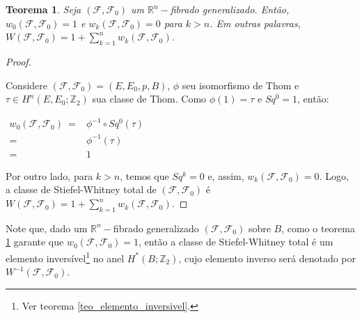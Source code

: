 \documentclass[12pt,oneside]{book} %
\newtheorem{teo}    {\hspace{0.5cm}Teorema}[chapter]
\newcommand{\ds}{\displaystyle}
\newcommand{\R}{\mathbb{R}}
\newcommand{\Z}{\mathbb{Z}}
\begin{document}
\begin{teo}\label{res_SW_fht_1}
	Seja $(\mathcal{F},\mathcal{F}_{0})$ um $\R^{n}-$fibrado generalizado. Então, $w_{0}(\mathcal{F},\mathcal{F}_{0})=1$ e $w_{k}(\mathcal{F},\mathcal{F}_{0})=0$ para $k>n$. Em outras palavras, $W(\mathcal{F},\mathcal{F}_{0})=1+\ds\sum_{k=1}^{n}w_{k}(\mathcal{F},\mathcal{F}_{0})$.
\end{teo}
\begin{proof}
	
	\
	
	\par Considere $(\mathcal{F},\mathcal{F}_{0})=(E,E_{0},p,B)$, $\phi$ seu isomorfismo de Thom e $\tau\in H^{n}(E,E_{0};\Z_{2})$ sua classe de Thom. Como $\phi(1)=\tau$ e $Sq^{0}=1$, então: \newline
	
	$\begin{array}{rl}
		w_{0}(\mathcal{F},\mathcal{F}_{0}) \ = & \phi^{-1}\circ Sq^{0}(\tau) \\
		= & \phi^{-1}(\tau) \\
		= & 1
	\end{array}$ \newline
	
	\par Por outro lado, para $k>n$, temos que $Sq^{k}=0$ e, assim, $w_{k}(\mathcal{F},\mathcal{F}_{0})=0$. Logo, a classe de Stiefel-Whitney total de $(\mathcal{F},\mathcal{F}_{0})$ é $W(\mathcal{F},\mathcal{F}_{0})=1+\ds\sum_{k=1}^{n}w_{k}(\mathcal{F},\mathcal{F}_{0})$.
	
\end{proof}

\par Note que, dado um $\R^{n}-$fibrado generalizado $(\mathcal{F},\mathcal{F}_{0})$ sobre $B$, como o teorema \ref{res_SW_fht_1} garante que $w_{0}(\mathcal{F},\mathcal{F}_{0})=1$, então a classe de Stiefel-Whitney total é um elemento inversível\footnote{Ver teorema \ref{teo_elemento_inversivel}.} no anel $H^{*}(B;\Z_{2})$, cujo elemento inverso será denotado por $W^{-1}(\mathcal{F},\mathcal{F}_{0})$.
\end{document}
